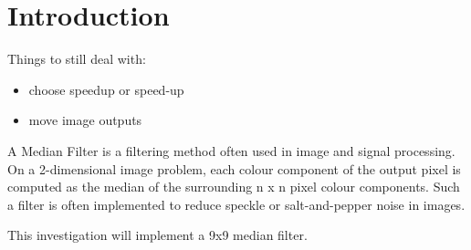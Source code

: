 \section{Introduction}
Things to still deal with:
\begin{itemize}
	\item choose speedup or speed-up
	\item move image outputs
\end{itemize}
A Median Filter is a filtering method often used in image and signal processing. On a 2-dimensional image problem, each colour component of the output pixel is computed as the median of the surrounding n x n pixel colour components. Such a filter is often implemented to reduce speckle or salt-and-pepper noise in images\cite{NSP}.

This investigation will implement a 9x9 median filter.

